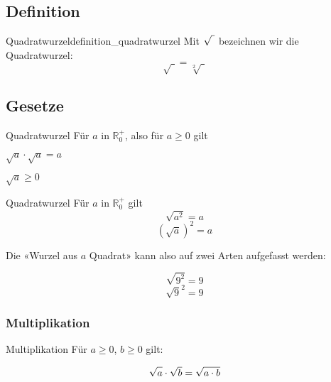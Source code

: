 \newpage

\subsection{Definition}
\begin{definition}{Quadratwurzel}{definition_quadratwurzel}
Mit $\sqrt{\vphantom{b} \,\,}$ bezeichnen wir die
Quadratwurzel:
$$\sqrt{\,\,}  = \sqrt[2]{\,\,}$$
\end{definition}

\subsection{Gesetze}

\begin{definition}{Quadratwurzel}{}
Für $a$ in $\mathbb{R}_0^{+}$, also für $a\ge 0$ gilt

$\sqrt{a} \cdot \sqrt{a} = a$

$\sqrt{a} \ge 0$
\end{definition}

\begin{gesetz}{Quadratwurzel}{}
Für $a$ in $\mathbb{R}_0^{+}$ gilt
$$\sqrt{a^2} = a$$
$$(\sqrt{a})^2 = a$$
\end{gesetz}


Die «Wurzel aus $a$ Quadrat» kann also auf zwei Arten aufgefasst werden:


\begin{beispiel}{}{}
$$\sqrt{9^2}=9$$
$$\sqrt{9}^2 = 9$$
\end{beispiel}





\newpage
\subsubsection{Multiplikation}

\begin{gesetz}{Multiplikation}{}
  Für $a\ge 0$, $b\ge 0$ gilt:
 
$$\sqrt{\vphantom{b}a}\cdot{\sqrt{b}} = \sqrt{\vphantom{b}a\cdot{b}}$$

\end{gesetz}


